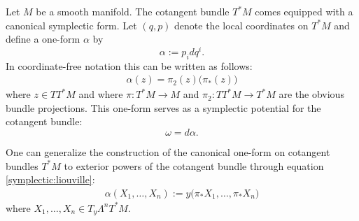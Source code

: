     \begin{construct}
        Let $M$ be a smooth manifold. The cotangent bundle $T^*M$ comes equipped with a canonical symplectic form. Let $(q,p)$ denote the local coordinates on $T^*M$ and define a one-form $\alpha$ by \[\alpha := p_idq^i.\] In coordinate-free notation this can be written as follows:
        \begin{gather}
            \label{symplectic:liouville}
            \alpha(z) = \pi_2(z)\big(\pi_*(z)\big)
        \end{gather}
        where $z\in TT^*M$ and where $\pi:T^*M\rightarrow M$ and $\pi_2:TT^*M\rightarrow T^*M$ are the obvious bundle projections. This one-form serves as a symplectic potential for the cotangent bundle: \[\omega = d\alpha.\]
    \end{construct}

    \begin{construct}
        One can generalize the construction of the canonical one-form on cotangent bundles $T^*M$ to exterior powers of the cotangent bundle through equation \ref{symplectic:liouville}:
        \begin{gather}
            \alpha(X_1,\ldots,X_n) := y\big(\pi_*X_1,\ldots,\pi_*X_n\big)
        \end{gather}
        where $X_1,\ldots,X_n\in T_y\Lambda^nT^*M$.
    \end{construct}

